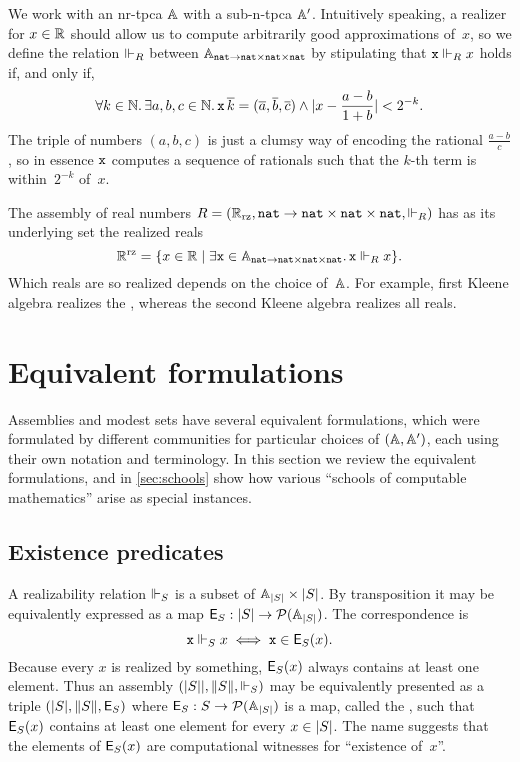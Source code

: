 We work with an nr-tpca $\AA$ with a sub-n-tpca $\subAA$. Intuitively speaking, a realizer for $x \in \RR$ should allow us to compute arbitrarily good approximations of~$x$, so we define the relation $\rz[R]$ between $\Atyp{\ttnat \to \ttnat \times \ttnat \times \ttnat}$ by stipulating that $\R{x} \rz[R] x$ holds if, and only if,
%
\begin{equation*}
  \all{k \in \NN} \some{a, b, c \in \NN}
  \R{x} \, \overline{k} = (\overline{a}, \overline{b}, \overline{c})
  \land |x - \frac{a - b}{1 + b}| < 2^{-k}.
\end{equation*}
%
The triple of numbers $(a, b, c)$ is just a clumsy way of encoding the rational $\frac{a - b}{c}$, so in essence $\R{x}$ computes a sequence of rationals such that the $k$-th term is within~$2^{-k}$ of~$x$.

The assembly of real numbers $R = (\RR_{\mathrm{rz}}, \ttnat \to \ttnat \times \ttnat \times \ttnat, {\rz[R]})$ has as its underlying set the realized reals
%
\begin{equation*}
  \RR^{\mathrm{rz}}
  = \set{x \in \RR \such \some{\R{x} \in \Atyp{\ttnat \to \ttnat \times \ttnat \times \ttnat}} \R{x} \rz[R] x}.
\end{equation*}
%
Which reals are so realized depends on the choice of~$\AA$. For example, first Kleene algebra realizes the , whereas the second Kleene algebra realizes all reals.

\section{Equivalent formulations}
\label{sec:equivalent-formulations}

Assemblies and modest sets have several equivalent formulations, which were formulated by different communities for particular choices of $(\AA, \subAA)$, each using their own notation and terminology. In this section we review the equivalent formulations, and in \cref{sec:schools} show how various ``schools of computable mathematics'' arise as special instances.

\subsection{Existence predicates}
\label{sec:existence-predicates}

A realizability relation $\rz[S]$ is a subset of $\xAtyp{S} \times \S{S}$. By transposition it may be equivalently expressed
as a map $\Ex{S} : \S{S} \to \pow{\xAtyp{S}}$. The correspondence is
%
\begin{equation*}
  \R{x} \rz[S] x \iff \R{x} \in \Ex{S}(x).
\end{equation*}
%
Because every $x$ is realized by something, $\Ex{S}(x)$ always contains at least one element. Thus an assembly $\xasm{S}$ may be equivalently presented as a triple $(\S{S}, \T{S}, \Ex{S})$ where $\Ex{S} : S \to \pow{\xAtyp{S}}$ is a map, called the , such that $\Ex{S}(x)$ contains at least one element for every $x \in \S{S}$. The name suggests that the elements of $\Ex{S}(x)$ are computational witnesses for ``existence of~$x$''.

